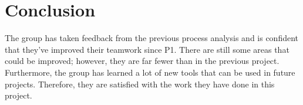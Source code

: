 \section{Conclusion}\label{sec:conclusion}

The group has taken feedback from the previous process analysis and is confident that they've improved their teamwork
since P1.
There are still some areas that could be improved; however, they are far fewer than in the previous project.
Furthermore, the group has learned a lot of new tools that can be used in future projects.
Therefore, they are satisfied with the work they have done in this project.
